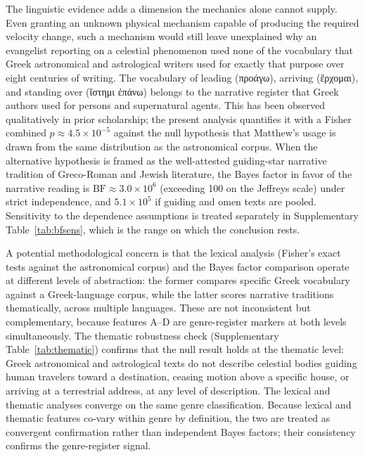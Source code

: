 \documentclass[11pt,a4paper]{article}
\newcommand{\grk}[1]{{\fontencoding{LGR}\selectfont #1}}
\newcommand{\grk}[1]{{\greekfont #1}}
\begin{document}
The linguistic evidence adds a dimension the mechanics alone cannot supply.
Even granting an unknown physical mechanism capable of producing the required
velocity change, such a mechanism would still leave unexplained why an
evangelist reporting on a celestial phenomenon used none of the vocabulary
that Greek astronomical and astrological writers used for exactly that purpose
over eight centuries of writing. The vocabulary of leading (\grk{προάγω}),
arriving (\grk{ἔρχομαι}), and standing over (\grk{ἵστημι ἐπάνω}) belongs to
the narrative register that Greek authors used for persons and supernatural
agents. This has been observed qualitatively in prior
scholarship\cite{adair2012,adair_jsnt}; the present analysis quantifies it
with a Fisher combined $p \approx 4.5\times10^{-5}$ against the null hypothesis
that Matthew's usage is drawn from the same distribution as the astronomical
corpus. When the alternative hypothesis is framed as the well-attested
guiding-star narrative tradition of Greco-Roman and Jewish literature, the
Bayes factor in favor of the narrative reading is $\mathrm{BF} \approx 3.0\times10^{6}$
(exceeding 100 on the Jeffreys scale) under strict independence, and
$5.1\times10^{5}$ if guiding and omen texts are pooled. Sensitivity to the
dependence assumptions is treated separately in
Supplementary Table~\ref{tab:bfsens}, which is the range on which the conclusion rests.

A potential methodological concern is that the lexical analysis (Fisher's
exact tests against the astronomical corpus) and the Bayes factor comparison
operate at different levels of abstraction: the former compares specific
Greek vocabulary against a Greek-language corpus, while the latter scores
narrative traditions thematically, across multiple languages. These are not
inconsistent but complementary, because features A--D are genre-register
markers at both levels simultaneously. The thematic robustness check
(Supplementary Table~\ref{tab:thematic}) confirms that the null result holds at the thematic level:
Greek astronomical and astrological texts do not describe celestial bodies
guiding human travelers toward a destination, ceasing motion above a
specific house, or arriving at a terrestrial address, at any level of
description. The lexical and thematic analyses converge on the same genre
classification. Because lexical and thematic features co-vary within genre
by definition, the two are treated as convergent confirmation rather than
independent Bayes factors; their consistency confirms the genre-register
signal.
\end{document}
